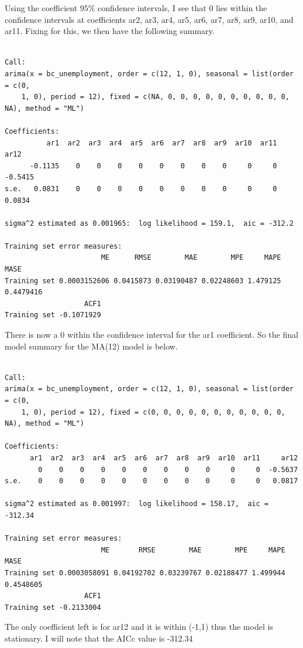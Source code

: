 \documentclass[
  letterpaper,
  DIV=11,
  numbers=noendperiod]{scrartcl}
\begin{document}
Using the coefficient 95\% confidence intervals, I see that 0 lies
within the confidence intervals at coefficients ar2, ar3, ar4, ar5, ar6,
ar7, ar8, ar9, ar10, and ar11. Fixing for this, we then have the
following summary.

\begin{verbatim}

Call:
arima(x = bc_unemployment, order = c(12, 1, 0), seasonal = list(order = c(0, 
    1, 0), period = 12), fixed = c(NA, 0, 0, 0, 0, 0, 0, 0, 0, 0, 0, NA), method = "ML")

Coefficients:
          ar1  ar2  ar3  ar4  ar5  ar6  ar7  ar8  ar9  ar10  ar11     ar12
      -0.1135    0    0    0    0    0    0    0    0     0     0  -0.5415
s.e.   0.0831    0    0    0    0    0    0    0    0     0     0   0.0834

sigma^2 estimated as 0.001965:  log likelihood = 159.1,  aic = -312.2

Training set error measures:
                       ME      RMSE        MAE        MPE     MAPE      MASE
Training set 0.0003152606 0.0415873 0.03190487 0.02248603 1.479125 0.4479416
                   ACF1
Training set -0.1071929
\end{verbatim}

There is now a 0 within the confidence interval for the ar1 coefficient.
So the final model summary for the MA(12) model is below.

\begin{verbatim}

Call:
arima(x = bc_unemployment, order = c(12, 1, 0), seasonal = list(order = c(0, 
    1, 0), period = 12), fixed = c(0, 0, 0, 0, 0, 0, 0, 0, 0, 0, 0, NA), method = "ML")

Coefficients:
      ar1  ar2  ar3  ar4  ar5  ar6  ar7  ar8  ar9  ar10  ar11     ar12
        0    0    0    0    0    0    0    0    0     0     0  -0.5637
s.e.    0    0    0    0    0    0    0    0    0     0     0   0.0817

sigma^2 estimated as 0.001997:  log likelihood = 158.17,  aic = -312.34

Training set error measures:
                       ME       RMSE        MAE        MPE     MAPE      MASE
Training set 0.0003058091 0.04192702 0.03239767 0.02188477 1.499944 0.4548605
                   ACF1
Training set -0.2133004
\end{verbatim}

The only coefficient left is for ar12 and it is within (-1,1) thus the
model is stationary. I will note that the AICc value is -312.34
\end{document}
